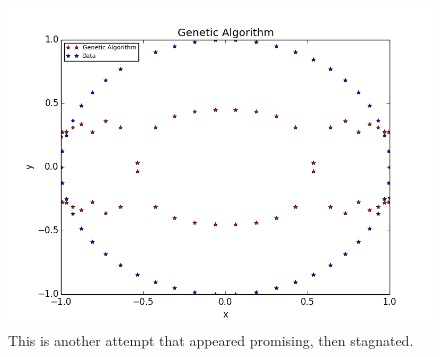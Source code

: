 \documentclass[11pt,amsmath,amssymb]{revtex4}
\begin{document}
\begin{figure}[H]
\center
\includegraphics[scale=0.55]{circly.png}
\caption{This is another attempt that appeared promising, then stagnated.}
\label{q1}
\end{figure}


\newpage\newpage
\end{document}
